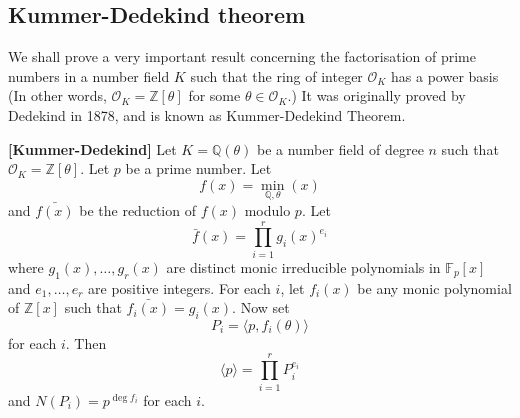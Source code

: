 \subsection{Kummer-Dedekind theorem}

We shall prove a very important result concerning the factorisation of prime numbers in a number field $K$ such that the ring of integer $\mathcal{O}_K$ has a power basis (In other words, $\mathcal{O}_K=\mathbb{Z}[\theta]$ for some $\theta \in \mathcal{O}_K$.) It was originally proved by Dedekind in 1878, and is known as Kummer-Dedekind Theorem.

\begin{theorem}{\bf [Kummer-Dedekind]}\label{K;Kummer-Dedekind} 
Let $K=\mathbb{Q}(\theta)$ be a number field of
degree $n$ such that $\mathcal{O}_K=\mathbb{Z}[\theta]$. Let $p$ be a prime number.
Let $$f(x)=\min_{\mathbb{Q},\theta}(x)$$ and $\bar{f(x)}$ be the reduction of $f(x)$ modulo $p$.
Let $$\bar{f}(x)=\prod_{i=1}^r g_i(x)^{e_i}$$ where $g_1(x),\ldots,g_r(x)$ are distinct monic irreducible polynomials in $\mathbb{F}_p[x]$ and $e_1,\ldots,e_r$ are positive integers. For each $i$, let $f_i(x)$ be any
monic polynomial of $\mathbb{Z}[x]$ such that $\bar{f_i(x)}=g_i(x)$. Now set
$$P_i=\langle p, f_i(\theta)\rangle$$
for each $i$. Then
$$\langle p \rangle = \prod_{i=1}^r P^{e_i}_i$$
and $N(P_i)=p^{\deg{f_i}}$ for each $i$.
\end{theorem}

